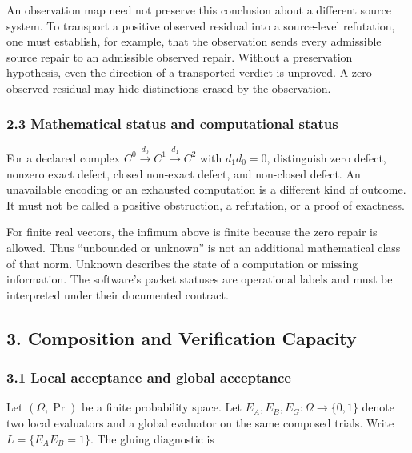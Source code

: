 \documentclass[
  10pt,
]{article}
\begin{document}
An observation map need not preserve this conclusion about a different source system. To transport a positive observed residual into a source-level refutation, one must establish, for example, that the observation sends every admissible source repair to an admissible observed repair. Without a preservation hypothesis, even the direction of a transported verdict is unproved. A zero observed residual may hide distinctions erased by the observation.

\subsubsection{2.3 Mathematical status and computational status}\label{mathematical-status-and-computational-status}

For a declared complex \hypertarget{math-E0020-0020}{}{\(C^0\xrightarrow{d_0}C^1\xrightarrow{d_1}C^2\)} with \hypertarget{math-E0021-0021}{}{\(d_1d_0=0\)}, distinguish zero defect, nonzero exact defect, closed non-exact defect, and non-closed defect. An unavailable encoding or an exhausted computation is a different kind of outcome. It must not be called a positive obstruction, a refutation, or a proof of exactness.

For finite real vectors, the infimum above is finite because the zero repair is allowed. Thus ``unbounded or unknown'' is not an additional mathematical class of that norm. Unknown describes the state of a computation or missing information. The software's packet statuses are operational labels and must be interpreted under their documented contract.

\subsection{3. Composition and Verification Capacity}\label{composition-and-verification-capacity}

\subsubsection{3.1 Local acceptance and global acceptance}\label{local-acceptance-and-global-acceptance}

Let \hypertarget{math-E0022-0022}{}{\((\Omega,\Pr)\)} be a finite probability space. Let \hypertarget{math-E0023-0023}{}{\(E_A,E_B,E_G:\Omega\to\{0,1\}\)} denote two local evaluators and a global evaluator on the same composed trials. Write \hypertarget{math-E0024-0024}{}{\(L=\{E_AE_B=1\}\)}. The gluing diagnostic is
\end{document}
